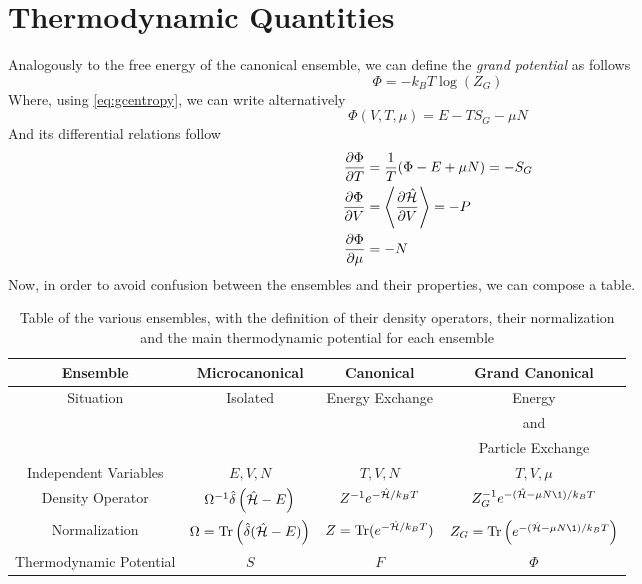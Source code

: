 \documentclass[../qm.tex]{subfiles}
\begin{document}
	\section{Thermodynamic Quantities}
	Analogously to the free energy of the canonical ensemble, we can define the \textit{grand potential} as follows
	\begin{equation}
		\Phi=-k_BT\log(Z_G)
		\label{eq:grandpotential}
	\end{equation}
	Where, using \eqref{eq:gcentropy}, we can write alternatively
	\begin{equation}
		\Phi(V,T,\mu)=E-TS_G-\mu N
		\label{eq:gpotcomp}
	\end{equation}
	And its differential relations follow
	\begin{equation}
		\begin{aligned}
			\pdv{\Phi}{T}&=\frac{1}{T}(\Phi-E+\mu N)=-S_G\\
			\pdv{\Phi}{V}&=\expval{\pdv{\hat{\mathcal{H}}}{V}}=-P\\
			\pdv{\Phi}{\mu}&=-N
		\end{aligned}
		\label{eq:derivatives}
	\end{equation}
	Now, in order to avoid confusion between the ensembles and their properties, we can compose a table.
	\begin{table}[H]
		\centering
		\begin{tabular}{|c|c|c|c|}
			\hline
			Ensemble&Microcanonical&Canonical&Grand Canonical\\
			\hline
			Situation&Isolated&Energy Exchange&Energy\\
			&&&and\\
			&&&Particle Exchange\\
			\hline
			Independent Variables&$E,V,N$&$T,V,N$&$T,V,\mu$\\
			\hline
			Density Operator&$\Omega^{-1}\hat{\delta}\left( \hat{\mathcal{H}}-E \right)$&$Z^{-1}e^{-\hat{\mathcal{H}}/k_BT}$&$Z_G^{-1}e^{-(\opr{\ham}-\mu N\1)/k_BT}$\\
			\hline
			Normalization&$\Omega=\mathrm{Tr}\left( \hat{\delta}(\hat{\mathcal{H}}-E) \right)$&$Z=\mathrm{Tr}(e^{-\hat{\mathcal{H}}/k_BT})$&$Z_G=\trace\left( e^{-(\opr{\ham}-\mu N\1)/k_BT} \right)$\\
			\hline
			Thermodynamic Potential&$S$&$F$&$\Phi$\\
			\hline
		\end{tabular}
		\caption{Table of the various ensembles, with the definition of their density operators, their normalization and the main thermodynamic potential for each ensemble}
		\label{tab:ensembles}
	\end{table}
\end{document}
